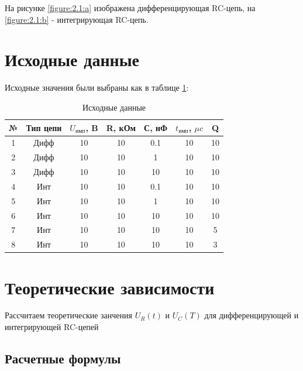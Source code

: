 На рисунке \ref{figure:2.1:a} изображена дифференцирующая RC-цепь, на \ref{figure:2.1:b} - интегрирующая RC-цепь.


\section{Исходные данные}

Исходные значения были выбраны как в таблице \ref{tab:3:1}:


\begin{table}[H]
	\begin{center}
	\caption{Исходные данные}
	\def\arraystretch{1.5}
		\begin{tabular}{|c|c|c|c|c|c|c|}
			\hline 
			№ & Тип цепи & $U_\text{имп}$, B & R, кОм & С, нФ & $t_\text{имп}$, $\mu c$ & Q\\ 
			\hline 
			1 & Дифф & 10 & 10 & 0.1 & 10 & 10\\ 
			\hline 
			2 & Дифф & 10 & 10 & 1 & 10 & 10\\ 
			\hline 
			3 & Дифф & 10 & 10 & 10 & 10 & 10\\ 
			\hline 
			4 & Инт & 10 & 10 & 0.1 & 10 & 10\\ 
			\hline 
			5 & Инт & 10 & 10 & 1 & 10 & 10\\ 
			\hline 
			6 & Инт & 10 & 10 & 10 & 10 & 10\\
			\hline 
			7 & Инт & 10 & 10 & 10 & 10 & 5\\ 
			\hline 
			8 & Инт & 10 & 10 & 10 & 10 & 3\\ 
			\hline
		\end{tabular}
		\label{tab:3:1}
	\end{center}
\end{table}

\section{Теоретические зависимости}

Рассчитаем теоретические занчения $U_R(t)$ и $U_C(T)$ для дифференцирующей и интегрирующей RC-цепей

\subsection{Расчетные формулы}


